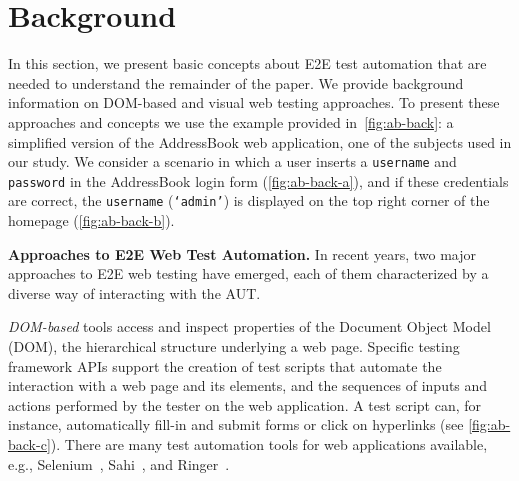 \section{Background}\label{sec:background}

In this section, we present basic concepts
about E2E test automation that are needed 
to understand the remainder of the paper.
We provide background information on 
DOM-based and visual web testing approaches.
To present these approaches and concepts
we use the example provided in~\autoref{fig:ab-back}: 
a simplified version of the AddressBook web application, 
one of the subjects used in our study. 
We consider a scenario in which a user 
inserts a \texttt{username} and \texttt{password} 
in the AddressBook login form 
(\autoref{fig:ab-back-a}), 
and if these credentials are correct, 
the \texttt{username} (\texttt{`admin'}) is displayed on the top right corner of the homepage 
(\autoref{fig:ab-back-b}).

\noindent
\textbf{Approaches to E2E Web Test Automation.}
In recent years, two major approaches to E2E web testing have emerged, each of them characterized by a diverse way of interacting with the AUT. 

\textit{DOM-based} tools access and inspect properties of the Document Object Model (DOM), the hierarchical structure underlying a web page. 
Specific testing framework APIs support the creation of test scripts that automate the interaction with a web page and its elements, and the sequences of inputs and actions performed by the tester on the web application. A test script can, for instance, automatically fill-in and submit forms or click on hyperlinks (see \autoref{fig:ab-back-c}). There are many test automation tools for web applications available, e.g., Selenium~\cite{selenium}, Sahi~\cite{sahi}, and Ringer~\cite{ringer}. %

